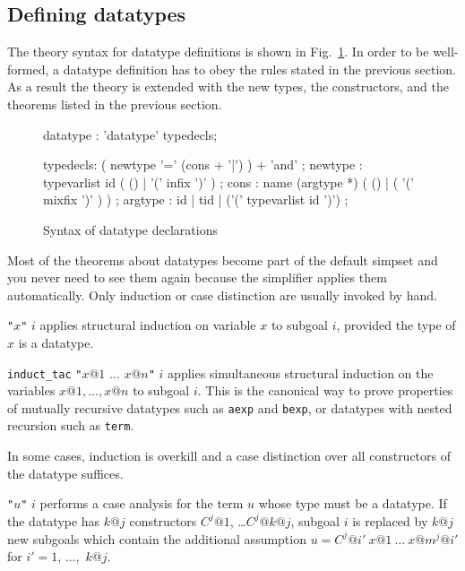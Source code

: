 \subsection{Defining datatypes}

The theory syntax for datatype definitions is shown in
Fig.~\ref{datatype-grammar}.  In order to be well-formed, a datatype
definition has to obey the rules stated in the previous section.  As a result
the theory is extended with the new types, the constructors, and the theorems
listed in the previous section.

\begin{figure}
\begin{rail}
datatype : 'datatype' typedecls;

typedecls: ( newtype '=' (cons + '|') ) + 'and'
         ;
newtype  : typevarlist id ( () | '(' infix ')' )
         ;
cons     : name (argtype *) ( () | ( '(' mixfix ')' ) )
         ;
argtype  : id | tid | ('(' typevarlist id ')')
         ;
\end{rail}
\caption{Syntax of datatype declarations}
\label{datatype-grammar}
\end{figure}

Most of the theorems about datatypes become part of the default simpset and
you never need to see them again because the simplifier applies them
automatically.  Only induction or case distinction are usually invoked by hand.
\begin{ttdescription}
\item[\ttindexbold{induct_tac} {\tt"}$x${\tt"} $i$]
 applies structural induction on variable $x$ to subgoal $i$, provided the
 type of $x$ is a datatype.
\item[\texttt{induct_tac}
  {\tt"}$x@1$ $\ldots$ $x@n${\tt"} $i$] applies simultaneous
  structural induction on the variables $x@1,\ldots,x@n$ to subgoal $i$.  This
  is the canonical way to prove properties of mutually recursive datatypes
  such as \texttt{aexp} and \texttt{bexp}, or datatypes with nested recursion such as
  \texttt{term}.
\end{ttdescription}
In some cases, induction is overkill and a case distinction over all
constructors of the datatype suffices.
\begin{ttdescription}
\item[\ttindexbold{case_tac} {\tt"}$u${\tt"} $i$]
 performs a case analysis for the term $u$ whose type  must be a datatype.
 If the datatype has $k@j$ constructors  $C^j@1$, \dots $C^j@{k@j}$, subgoal
 $i$ is replaced by $k@j$ new subgoals which  contain the additional
 assumption $u = C^j@{i'}~x@1~\dots~x@{m^j@{i'}}$ for  $i'=1$, $\dots$,~$k@j$.
\end{ttdescription}

